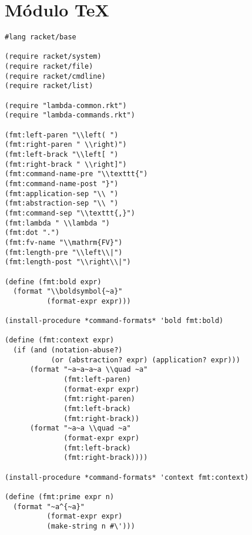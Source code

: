 \section{Módulo \TeX}
\label{ap:2:tex}

\begin{lstlisting}[language=racket]
#lang racket/base

(require racket/system)
(require racket/file)
(require racket/cmdline)
(require racket/list)

(require "lambda-common.rkt")
(require "lambda-commands.rkt")

(fmt:left-paren "\\left( ")
(fmt:right-paren " \\right)")
(fmt:left-brack "\\left[ ")
(fmt:right-brack " \\right]")
(fmt:command-name-pre "\\texttt{")
(fmt:command-name-post "}")
(fmt:application-sep "\\ ")
(fmt:abstraction-sep "\\ ")
(fmt:command-sep "\\texttt{,}")
(fmt:lambda " \\lambda ")
(fmt:dot ".")
(fmt:fv-name "\\mathrm{FV}")
(fmt:length-pre "\\left\\|")
(fmt:length-post "\\right\\|")

(define (fmt:bold expr)
  (format "\\boldsymbol{~a}"
          (format-expr expr)))

(install-procedure *command-formats* 'bold fmt:bold)

(define (fmt:context expr)
  (if (and (notation-abuse?)
           (or (abstraction? expr) (application? expr)))
      (format "~a~a~a~a \\quad ~a"
              (fmt:left-paren)
              (format-expr expr)
              (fmt:right-paren)
              (fmt:left-brack)
              (fmt:right-brack))
      (format "~a~a \\quad ~a"
              (format-expr expr)
              (fmt:left-brack)
              (fmt:right-brack))))

(install-procedure *command-formats* 'context fmt:context)

(define (fmt:prime expr n)
  (format "~a^{~a}"
          (format-expr expr)
          (make-string n #\')))


\end{lstlisting}
